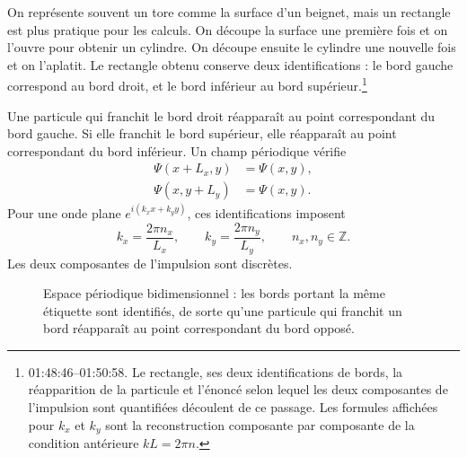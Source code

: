 On représente souvent un tore comme la surface d’un beignet, mais un rectangle est plus pratique pour les calculs. On découpe la surface une première fois et on l’ouvre pour obtenir un cylindre. On découpe ensuite le cylindre une nouvelle fois et on l’aplatit. Le rectangle obtenu conserve deux identifications : le bord gauche correspond au bord droit, et le bord inférieur au bord supérieur.\footnote{01:48:46--01:50:58. Le rectangle, ses deux identifications de bords, la réapparition de la particule et l’énoncé selon lequel les deux composantes de l’impulsion sont quantifiées découlent de ce passage. Les formules affichées pour \(k_x\) et \(k_y\) sont la reconstruction composante par composante de la condition antérieure \(kL=2\pi n\).}

Une particule qui franchit le bord droit réapparaît au point correspondant du bord gauche. Si elle franchit le bord supérieur, elle réapparaît au point correspondant du bord inférieur. Un champ périodique vérifie
\begin{align}
\Psi(x+L_x,y)&=\Psi(x,y),\\
\Psi(x,y+L_y)&=\Psi(x,y).
\end{align}
Pour une onde plane \(e^{i(k_x x+k_y y)}\), ces identifications imposent
\begin{equation}
k_x=\frac{2\pi n_x}{L_x},
\qquad
k_y=\frac{2\pi n_y}{L_y},
\qquad
n_x,n_y\in\mathbb Z.
\end{equation}
Les deux composantes de l’impulsion sont discrètes.

\begin{figure}[t]\centering
{}\caption{Espace périodique bidimensionnel : les bords portant la même étiquette sont identifiés, de sorte qu’une particule qui franchit un bord réapparaît au point correspondant du bord opposé.}\end{figure}

\begin{classroomqa}\end{classroomqa}

